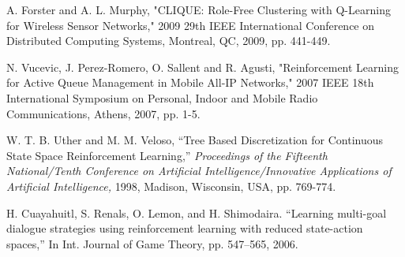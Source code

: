 \documentclass[journal]{IEEEtran}
\begin{document}
\begin{thebibliography}{1}
A. Forster and A. L. Murphy, "CLIQUE: Role-Free Clustering with Q-Learning for Wireless Sensor Networks," 2009 29th IEEE International Conference on Distributed Computing Systems, Montreal, QC, 2009, pp. 441-449.

N. Vucevic, J. Perez-Romero, O. Sallent and R. Agusti, "Reinforcement Learning for Active Queue Management in Mobile All-IP Networks," 2007 IEEE 18th International Symposium on Personal, Indoor and Mobile Radio Communications, Athens, 2007, pp. 1-5.

W. T. B. Uther and M. M. Veloso, ``Tree Based Discretization for Continuous State Space Reinforcement Learning,'' \emph{Proceedings of the Fifteenth National/Tenth Conference on Artificial Intelligence/Innovative Applications of Artificial Intelligence,} 1998, Madison, Wisconsin, USA, pp. 769-774.

H. Cuayahuitl, S. Renals, O. Lemon, and H. Shimodaira. ``Learning multi-goal dialogue strategies using reinforcement learning with reduced state-action spaces,'' In Int. Journal of Game Theory, pp. 547–565, 2006.

\end{thebibliography}


\end{document}
